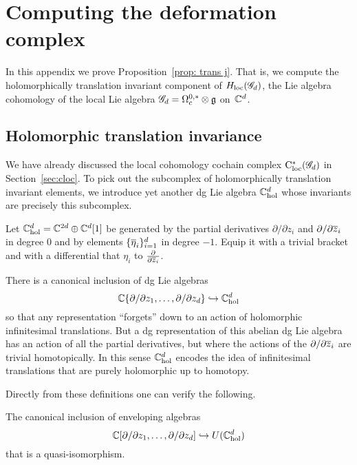 \appendix


\section{Computing the deformation complex}\label{sec: hol trans}

In this appendix we prove Proposition~\ref{prop: trans j}. 
That is, we compute the holomorphically translation invariant component of $H_{\rm loc}(\sG_d)$, 
the Lie algebra cohomology of the local Lie algebra $\sG_d = \Omega^{0,*}_c \tensor \fg$ on~$\CC^d$. 

\subsection{Holomorphic translation invariance}

We have already discussed the local cohomology cochain complex $\cloc^*(\sG_d)$ in Section~\ref{sec:cloc}.
To pick out the subcomplex of holomorphically translation invariant elements,
we introduce yet another dg Lie algebra $\CC^{d}_{\rm hol}$ whose invariants are precisely this subcomplex.

\begin{dfn}
Let $\CC^{d}_{\rm hol} = \CC^{2d} \oplus \CC^d[1]$ be generated by the partial derivatives $\partial/\partial z_i$ and $\partial/\partial \zbar_i$ in degree 0 and by elements $\{\Bar{\eta}_i\}_{i=1}^d$ in degree $-1$.
Equip it with a trivial bracket and with a differential that $\eta_i$ to $\frac{\partial}{\partial \zbar_i}$.
\end{dfn}

There is a canonical inclusion of dg Lie algebras
\[
\CC\{\partial / \partial z_1, \ldots, \partial / \partial z_d\} \hookrightarrow \CC^{d}_{\rm hol}
\]
so that any representation ``forgets'' down to an action of holomorphic infinitesimal translations.
But a dg representation of this abelian dg Lie algebra has an action of all the partial derivatives,
but where the actions of the $\partial/\partial \zbar_i$ are trivial homotopically.
In this sense $\CC^{d}_{\rm hol}$ encodes the idea of infinitesimal translations that are purely holomorphic up to homotopy.

Directly from these definitions one can verify the following.

\begin{lem}
The canonical inclusion of enveloping algebras
\[
\CC[\partial / \partial z_1, \ldots, \partial / \partial z_d] \hookrightarrow U(\CC^{d}_{\rm hol})
\]
that is a quasi-isomorphism.
\end{lem}

